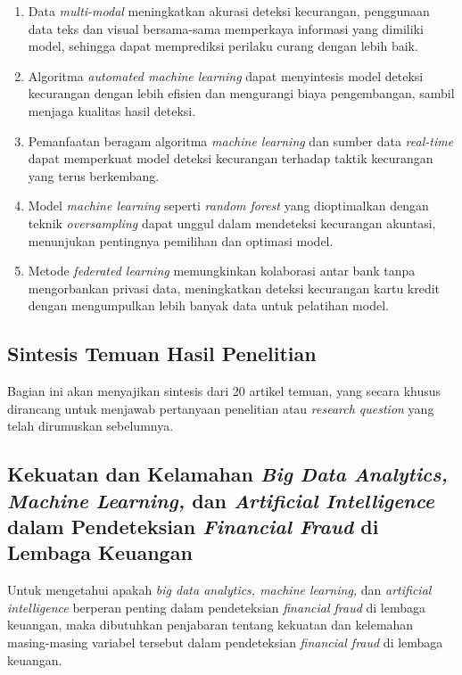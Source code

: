 \documentclass[12pt, a4paper]{article}
\begin{document}
\begin{enumerate}
    \setlength{\itemsep}{0pt}
    \item Data \textit{multi-modal} meningkatkan  akurasi  deteksi  kecurangan,  penggunaan  data  teks  dan  visual bersama-sama  
    memperkaya  informasi  yang  dimiliki  model,  sehingga  dapat  memprediksi  perilaku curang dengan lebih baik.
    \item Algoritma \textit{automated machine learning} dapat menyintesis model deteksi kecurangan dengan lebih
    efisien dan mengurangi biaya pengembangan, sambil menjaga kualitas hasil deteksi.
    \item Pemanfaatan beragam algoritma \textit{machine learning} dan sumber data \textit{real-time}
    dapat memperkuat model deteksi kecurangan terhadap taktik kecurangan yang terus berkembang.
    \item Model \textit{machine learning} seperti \textit{random forest} yang dioptimalkan dengan teknik
    \textit{oversampling} dapat unggul dalam mendeteksi kecurangan akuntasi, menunjukan pentingnya pemilihan
    dan optimasi model.
    \item Metode \textit{federated learning} memungkinkan kolaborasi antar bank tanpa mengorbankan privasi data,
    meningkatkan deteksi kecurangan kartu kredit dengan mengumpulkan lebih banyak data untuk pelatihan model.
\end{enumerate}

\subsection*{Sintesis Temuan Hasil Penelitian}
\hspace{1cm} Bagian ini akan menyajikan sintesis dari 20 artikel temuan, yang secara khusus dirancang
untuk menjawab pertanyaan penelitian atau \textit{research question} yang telah dirumuskan sebelumnya.

\subsection*{Kekuatan dan Kelamahan \textit{Big Data Analytics, Machine Learning,} dan \textit{Artificial Intelligence} dalam Pendeteksian \textit{Financial Fraud} di Lembaga Keuangan}
\hspace{1cm}Untuk mengetahui apakah \textit{big data analytics, machine learning,} dan \textit{artificial intelligence}
berperan penting dalam pendeteksian \textit{financial fraud} di lembaga keuangan, maka dibutuhkan penjabaran tentang kekuatan dan kelemahan masing-masing
variabel tersebut dalam pendeteksian \textit{financial fraud} di lembaga keuangan.
\end{document}
